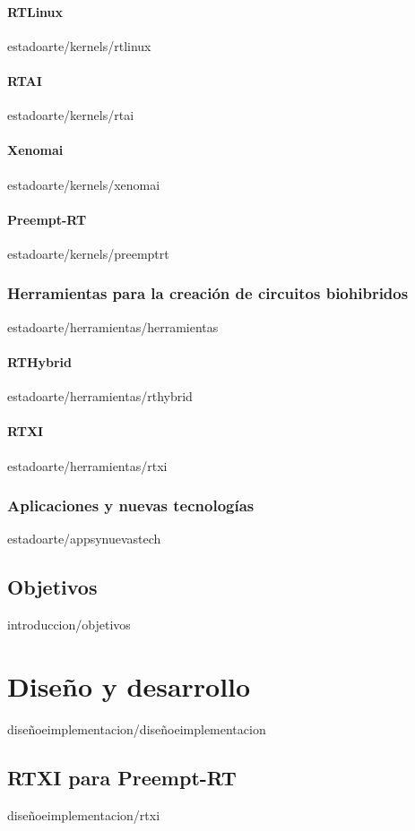 \documentclass[epsbased,copyright,final,printable,covers,extendedindex,firstnumbered,tfg,gnuplot]{tfgtfmthesisuam}
\begin{document}
      \subsubsection{RTLinux\label{SSS:RTLINUX}}{estadoarte/kernels/rtlinux}
      \subsubsection{RTAI\label{SSS:RTAI}}{estadoarte/kernels/rtai}
      \subsubsection{Xenomai\label{SSS:XENOMAI}}{estadoarte/kernels/xenomai}
      \subsubsection{Preempt-RT\label{SSS:PTREEMPTRT}}{estadoarte/kernels/preemptrt}
    \subsection{Herramientas para la creación de circuitos biohibridos\label{SS:HERRAMIENTAS}}{estadoarte/herramientas/herramientas}
      \subsubsection{RTHybrid\label{SSS:RTHYBRID}}{estadoarte/herramientas/rthybrid}
      \subsubsection{RTXI\label{SSS:RTXI}}{estadoarte/herramientas/rtxi}
     \subsection{Aplicaciones y nuevas tecnologías\label{SS:APPSYNUEVASTECH}}{estadoarte/appsynuevastech}
   \section{Objetivos\label{SEC:OBJETIVOS}}{introduccion/objetivos}

\chapter{Diseño y desarrollo\label{CAP:DISEÑOEIMPLEMENTACION}}{diseñoeimplementacion/diseñoeimplementacion}
  \section{RTXI para Preempt-RT\label{SEC:RTXIPREEMPTRT}}{diseñoeimplementacion/rtxi}
\end{document}
